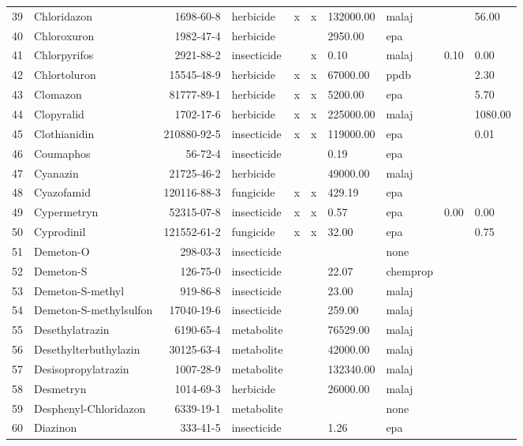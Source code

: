 \begin{longtable}{lp{3cm}rlp{0.5cm}p{0.5cm}p{1cm}p{1cm}p{1cm}p{1cm}}
  39 & Chloridazon & 1698-60-8 & herbicide & x & x & 132000.00 & malaj &  & 56.00 \\ 
  40 & Chloroxuron & 1982-47-4 & herbicide &  &  & 2950.00 & epa &  &  \\ 
  41 & Chlorpyrifos & 2921-88-2 & insecticide &  & x & 0.10 & malaj & 0.10 & 0.00 \\ 
  42 & Chlortoluron & 15545-48-9 & herbicide & x & x & 67000.00 & ppdb &  & 2.30 \\ 
  43 & Clomazon & 81777-89-1 & herbicide & x & x & 5200.00 & epa &  & 5.70 \\ 
  44 & Clopyralid & 1702-17-6 & herbicide & x & x & 225000.00 & malaj &  & 1080.00 \\ 
  45 & Clothianidin & 210880-92-5 & insecticide & x & x & 119000.00 & epa &  & 0.01 \\ 
  46 & Coumaphos & 56-72-4 & insecticide &  &  & 0.19 & epa &  &  \\ 
  47 & Cyanazin & 21725-46-2 & herbicide &  &  & 49000.00 & malaj &  &  \\ 
  48 & Cyazofamid & 120116-88-3 & fungicide & x & x & 429.19 & epa &  &  \\ 
  49 & Cypermetryn & 52315-07-8 & insecticide & x & x & 0.57 & epa & 0.00 & 0.00 \\ 
  50 & Cyprodinil & 121552-61-2 & fungicide & x & x & 32.00 & epa &  & 0.75 \\ 
  51 & Demeton-O & 298-03-3 & insecticide &  &  &  & none &  &  \\ 
  52 & Demeton-S & 126-75-0 & insecticide &  &  & 22.07 & chemprop &  &  \\ 
  53 & Demeton-S-methyl & 919-86-8 & insecticide &  &  & 23.00 & malaj &  &  \\ 
  54 & Demeton-S-methylsulfon & 17040-19-6 & insecticide &  &  & 259.00 & malaj &  &  \\ 
  55 & Desethylatrazin & 6190-65-4 & metabolite &  &  & 76529.00 & malaj &  &  \\ 
  56 & Desethylterbuthylazin & 30125-63-4 & metabolite &  &  & 42000.00 & malaj &  &  \\ 
  57 & Desisopropylatrazin & 1007-28-9 & metabolite &  &  & 132340.00 & malaj &  &  \\ 
  58 & Desmetryn & 1014-69-3 & herbicide &  &  & 26000.00 & malaj &  &  \\ 
  59 & Desphenyl-Chloridazon & 6339-19-1 & metabolite &  &  &  & none &  &  \\ 
  60 & Diazinon & 333-41-5 & insecticide &  &  & 1.26 & epa &  &  \\ 

\end{longtable}
